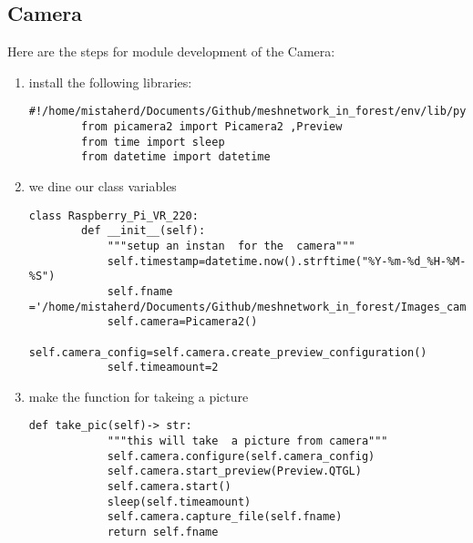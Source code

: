 \subsection{Camera}
Here are the steps for module development of the Camera:
\begin{enumerate}
    \item install the following libraries:
    \begin{lstlisting}[style=mystyle]
        #!/home/mistaherd/Documents/Github/meshnetwork_in_forest/env/lib/python3.11
        from picamera2 import Picamera2 ,Preview
        from time import sleep
        from datetime import datetime
    \end{lstlisting}
    \item we dine our class variables
    \begin{lstlisting}[style=mystyle]
    class Raspberry_Pi_VR_220:
        def __init__(self):
            """setup an instan  for the  camera"""
            self.timestamp=datetime.now().strftime("%Y-%m-%d_%H-%M-%S")
            self.fname ='/home/mistaherd/Documents/Github/meshnetwork_in_forest/Images_camera/{}.png'.format(self.timestamp)
            self.camera=Picamera2()
            self.camera_config=self.camera.create_preview_configuration()
            self.timeamount=2
    \end{lstlisting}
    \item  make the function for  takeing  a  picture
    \begin{lstlisting}[style=mystyle]
        def take_pic(self)-> str:
            """this will take  a picture from camera"""
            self.camera.configure(self.camera_config)
            self.camera.start_preview(Preview.QTGL)
            self.camera.start()
            sleep(self.timeamount)
            self.camera.capture_file(self.fname)
            return self.fname
    \end{lstlisting}
\end{enumerate}
\newpage
